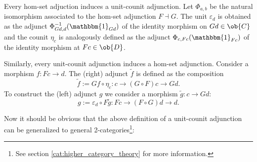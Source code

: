 
    \begin{property}
        Every hom-set adjuction induces a unit-counit adjunction. Let $\Phi_{a, b}$ be the natural isomorphism associated to the hom-set adjunction $F\dashv G$. The unit $\varepsilon_d$ is obtained as the adjunct $\Phi^{-1}_{Gd, d}(\mathbbm{1}_{Gd})$ of the identity morphism on $Gd\in\ob{C}$ and the counit $\eta_c$ is analogously defined as the adjunct $\Phi_{c, Fc}(\mathbbm{1}_{Fc})$ of the identity morphism at $Fc\in\ob{D}$.

        Similarly, every unit-counit adjunction induces a hom-set adjunction. Consider a morphism $f:Fc\rightarrow d$. The (right) adjunct $\tilde{f}$ is defined as the composition \[\tilde{f}:=Gf\circ\eta_c:c\rightarrow (G\circ F)c\rightarrow Gd.\] To construct the (left) adjunct $g$ we consider a morphism $\tilde{g}:c\rightarrow Gd$: \[g:=\varepsilon_d\circ F\tilde{g}: Fc\rightarrow (F\circ G)d\rightarrow d.\]
    \end{property}

    Now it should be obvious that the above definition of a unit-counit adjunction can be generalized to general 2-categories\footnote{See section \ref{cat:higher_category_theory} for more information.}:

